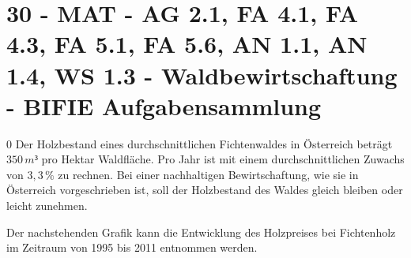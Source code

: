 \section{30 - MAT - AG 2.1, FA 4.1, FA 4.3, FA 5.1, FA 5.6, AN 1.1, AN 1.4, WS 1.3 - Waldbewirtschaftung - BIFIE Aufgabensammlung}

\begin{langesbeispiel} \item[0] %
				Der Holzbestand eines durchschnittlichen Fichtenwaldes in Österreich beträgt $350\,m³$ pro Hektar Waldfläche. Pro Jahr ist mit einem durchschnittlichen Zuwachs von $3,3\,\%$ zu rechnen. Bei einer nachhaltigen Bewirtschaftung, wie sie in Österreich vorgeschrieben ist, soll der Holzbestand des Waldes gleich bleiben oder leicht zunehmen.
				
Der nachstehenden Grafik kann die Entwicklung des Holzpreises bei Fichtenholz im Zeitraum von 1995 bis 2011 entnommen werden.

\begin{center}

\end{center}
\end{langesbeispiel}
